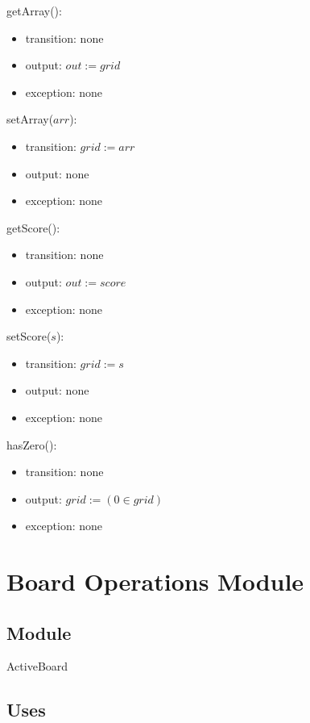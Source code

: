 \documentclass[12pt]{article}
\begin{document}
\noindent getArray():
\begin{itemize}
\item transition: none
\item output: $\mathit{out} := \mathit{grid}$
\item exception: none
\end{itemize}

\noindent setArray($\mathit{arr}$):
\begin{itemize}
\item transition: $\mathit{grid} := \mathit{arr}$
\item output: none
\item exception: none
\end{itemize}

\noindent getScore():
\begin{itemize}
\item transition: none
\item output: $\mathit{out} := \mathit{score}$
\item exception: none
\end{itemize}

\noindent setScore($\mathit{s}$):
\begin{itemize}
\item transition: $\mathit{grid} := \mathit{s}$
\item output: none
\item exception: none
\end{itemize}

\noindent hasZero():
\begin{itemize}
\item transition: none
\item output: $\mathit{grid} := (0 \in grid)$
\item exception: none
\end{itemize}

\newpage


\section* {Board Operations Module}

\subsection*{Module}

ActiveBoard

\subsection* {Uses}
\end{document}
